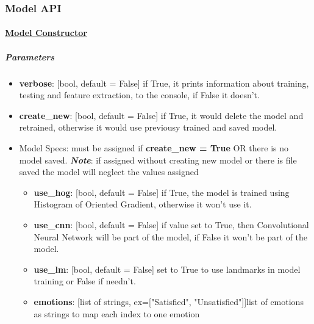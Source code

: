 \newpage 
\subsubsection{Model API}
\paragraph{\underline{Model Constructor}}

\subparagraph{Parameters}
\begin{changemargin}{0.5cm}{0cm}
\begin{itemize}
	\item \textbf{verbose}: [bool, default = False] if True, it prints information about training, testing and feature extraction, to the console, if False it doesn't.
	
	\item \textbf{create\_new}: [bool, default = False] if True, it would delete the model and retrained, otherwise it would use previousy trained and saved model.
	
	\item Model Specs: must be assigned if \textbf{create\_new = True} OR there is no model saved.
		\newline
		\textbf{\textit{Note}}: if assigned without creating new model or there is file saved the model will neglect the values assigned
		\begin{itemize}
			\item \textbf{use\_hog}: [bool, default = False] if True, the model is trained using  Histogram of Oriented Gradient, otherwise it won't use it.

			\item \textbf{use\_cnn}: [bool, default = False] if value set to True, then Convolutional Neural Network will be part of the model, if False it won't be part of the model.
			
			\item \textbf{use\_lm}: [bool, default = False] set to True to use landmarks in model training or False if needn't.
			
			\item \textbf{emotions}: [list of strings, ex=["Satisfied", "Unsatisfied"]]list of emotions as strings to map each index to one emotion 
		\end{itemize}
		
\end{itemize}
\end{changemargin}

